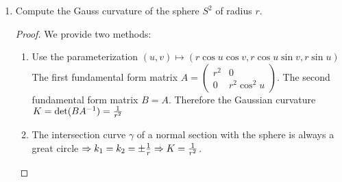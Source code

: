 \documentclass{article}
\DeclarePairedDelimiter\abs{\lvert}{\rvert}
\DeclarePairedDelimiter\norm{\lVert}{\rVert}
\def\v#1{\overrightarrow{#1}}
\begin{document}
\begin{enumerate}
\begin{enumerate}[label=(\arabic*)]
\item Prove that a surface $\Sigma$ is part of a sphere if and only if its second fundamental form $\Pi_p$ is a non-zero-constant multiple of its first fundamental form $I_p$, i.e. $\Pi_p = c I_p$ for some real number $c$ and each $p\in \Sigma$.
\end{enumerate}
\begin{proof}\mbox{}
\begin{enumerate}[label=(\arabic*)]
\item $\Rightarrow:$ the second partial derivative of $\sigma$ with respect to $u,v$ is zero, therefore the second fundamental form is zero.

$\Leftarrow: $ We know that $\sigma_u \cdot \v{n} = 0 \Rightarrow \sigma_{uu} \cdot \v{n} + \sigma_{u} \cdot \v{n}_u =0$. Since $L=\sigma_{uu}\cdot \v{n}=0$, we have $ \sigma_{u} \cdot \v{n}_u =0$. 
Also $\sigma_{uv} \cdot \v{n} + \sigma_{u} \cdot \v{n}_v =0 \Rightarrow \sigma_v \cdot \v{n}_u = 0$. From $\v{n}\cdot \v{n} = 1 \Rightarrow \v{n}\cdot \v{n}_u = 0 $. While $\v{n},\sigma_u,\sigma_v$ is an orthogonal basis of $\mathbb{R}^3$, $\v{n}_u=0$. By the same deduction, $\v{n}_v=0$. Then $\v{n}$ is a constant unit vector and integrate $\sigma_u\cdot \v{n}=0$ gives $\sigma \cdot \v{n}=c$, which is the equation of a plane in $\mathbb{R}^3$.
\item $\Rightarrow:$ See the next problem solution for detail.

$\Leftarrow:$ We know that $\binom{\v{n}_u}{\v{n}_v} = -BA^{-1} \binom{\sigma_u}{\sigma_v}$. Since $B=c A$, $\v{n}_u=-c \sigma_u, \v{n}_v = -c \sigma_v \Rightarrow \v{n} + c\sigma = a \Rightarrow \norm{\sigma-{a \over c}} = \abs{{1\over c}}$. That is, $\Sigma$ is part of a sphere.
\end{enumerate}
\end{proof}
\item Compute the Gauss curvature of the sphere $S^2$ of radius $r$.
\begin{proof}
We provide two methods:
\begin{enumerate}
\item Use the parameterization $(u,v)\longmapsto (r\cos u \cos v,r\cos u \sin v,r\sin u)$
The first fundamental form matrix $A = \begin{pmatrix} r^2 & 0 \\ 0 & r^2\cos^2 u \end{pmatrix}$.
The second fundamental form matrix $B = A$.
Therefore the Gaussian curvature $K=\det(BA^{-1})={1 \over r^2}$
\item The intersection curve $\gamma $ of a normal section with the sphere is always a great circle $\Rightarrow k_1 =k_2 =\pm {1\over r} \Rightarrow K= {1\over r^2}$. 
\end{enumerate}
\end{proof}
\end{enumerate}
\end{document}
